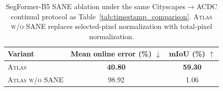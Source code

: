 \begin{table}
\vspace{-10pt}
\centering
\scriptsize
\setlength{\tabcolsep}{4pt}
\renewcommand{\arraystretch}{1.06}
\caption{SegFormer-B5 SANE ablation under the same Cityscapes$\rightarrow$ACDC continual protocol as Table~\ref{tab:timestamp_comparison}. \textsc{Atlas w/o SANE} replaces selected-pixel normalization with total-pixel normalization.}
\label{tab:sane_seg_placeholder}
\begin{tabular}{lcc}
\toprule
Variant & Mean online error (\%) $\downarrow$ & mIoU (\%) $\uparrow$ \\
\midrule
\textsc{Atlas} & \textbf{40.80} & \textbf{59.30} \\
\textsc{Atlas w/o SANE} & 98.92 & 1.06 \\
\bottomrule
\end{tabular}
\vspace{-8pt}
\end{table}
